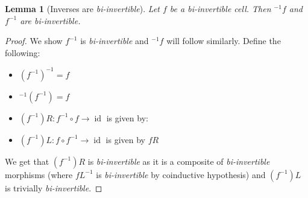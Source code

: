 \documentclass{article}
\newtheorem{lemma}{Lemma}
\theoremstyle{definition}
\theoremstyle{examplestyle}
\DeclareMathOperator{\id}{id}
\newcommand{\linv}[1]{{}^{-1}\!#1}
\newcommand{\rinv}[1]{#1^{-1}}
\begin{document}
\begin{lemma}[Inverses are \emph{bi-invertible}]
  \label{lem:inverses}
  Let \(f\) be a \emph{bi-invertible} cell. Then \(\linv f\) and \(\rinv f\) are \emph{bi-invertible}.
\end{lemma}
\begin{proof}
  We show \(\rinv f\) is \emph{bi-invertible} and \(\linv f\) will follow similarly. Define the following:
  \begin{itemize}
  \item \(\rinv {(\rinv f)} = f\)
  \item \(\linv {(\rinv f)} = f\)
  \item \((\rinv f)R: \rinv f \circ f \to \id\) is given by:
    \begin{center}
    \end{center}
  \item \((\rinv f)L: f \circ \rinv f \to \id\) is given by \(fR\)
  \end{itemize}
  We get that \((\rinv f)R\) is \emph{bi-invertible} as it is a composite of \emph{bi-invertible} morphisms (where \(\rinv {fL}\) is \emph{bi-invertible} by coinductive hypothesis) and \((\rinv f)L\) is trivially \emph{bi-invertible}.
\end{proof}
\end{document}
